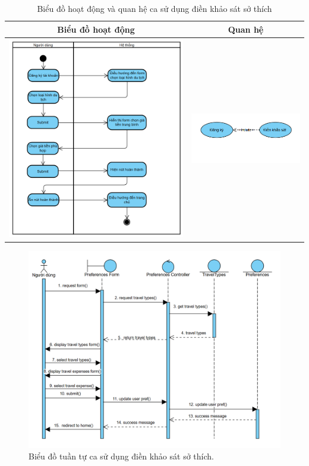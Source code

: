 \begin{table}[H] %
    \centering
    \caption{Biểu đồ hoạt động và quan hệ ca sử dụng điền khảo sát sở thích} %
    \label{tab:uc_survey_diagrams} %
    \begin{tabular}{| c | c |}
        \hline
        \textbf{Biểu đồ hoạt động} & \textbf{Quan hệ} \\
        \hline
        \includegraphics[width=0.5\linewidth]{figures/c3/3-3-3-ad.png}
        &
        \includegraphics[width=0.45\linewidth]{figures/c3/3-3-3-rd.png} \\
        \hline
    \end{tabular}
\end{table}


\begin{figure}[H]
    \centering
    \includegraphics[width=1\textwidth]{figures/c3/3-3-3-sd.png}
    \caption{Biểu đồ tuần tự ca sử dụng điền khảo sát sở thích.}
    \label{fig:3-3-3-sequence-diagram}
\end{figure}